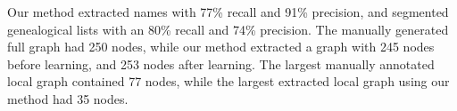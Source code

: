 \documentclass{llncs}
\begin{document}
Our method extracted names with 77\% recall and 91\% precision, and segmented genealogical lists with an 80\% recall
and 74\% precision. 
The manually generated full graph had 250 nodes, while our method extracted a graph with 245 nodes
before learning, and 253 nodes after learning. 
The largest manually annotated local graph contained 77 nodes, while the largest extracted local graph
using our method had 35 nodes. 

%
%

%
\end{document}
